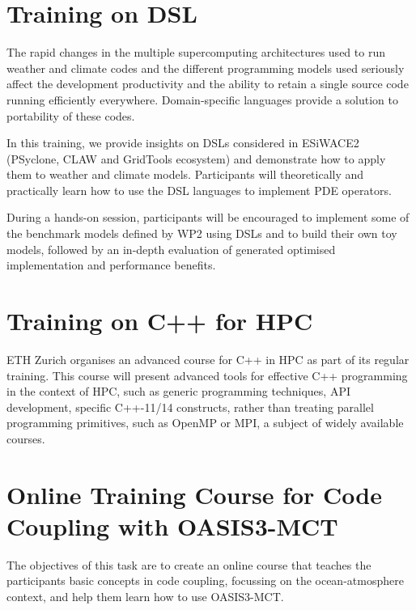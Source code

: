\section{Training on DSL}

The rapid changes in the multiple supercomputing architectures used to run weather and climate codes and the different programming models used seriously affect the development productivity and the ability to retain a single source code running efficiently everywhere. Domain-specific languages provide a solution to portability of these codes.

In this training, we provide insights on DSLs considered in ESiWACE2 (PSyclone, CLAW and GridTools ecosystem) and demonstrate how to apply them to weather and climate models.
Participants will theoretically and practically learn how to use the DSL languages to implement PDE operators.

During a hands-on session, participants will be encouraged to implement some of the benchmark models defined by WP2 using DSLs and to build their own toy models, followed by an in-depth evaluation of generated optimised implementation and performance benefits.

\section{Training on C++ for HPC}

ETH Zurich organises an advanced course for C++ in HPC as part of its regular training.
This course will present advanced tools for effective C++ programming in the context of HPC, such as generic programming techniques, API development, specific C++-11/14 constructs, rather than treating parallel programming primitives, such as OpenMP or MPI, a subject of widely available courses.

\section{Online Training Course for Code Coupling with OASIS3-MCT}

The objectives of this task are to create an online course that teaches the participants basic concepts in code coupling, focussing on the ocean-atmosphere context, and help them learn how to use OASIS3-MCT.

